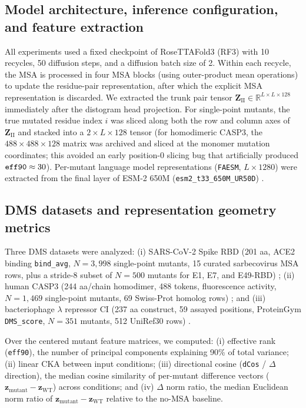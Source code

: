 \documentclass[10pt,a4paper]{article}
\begin{document}
\subsection{Model architecture, inference configuration, and feature extraction}
All experiments used a fixed checkpoint of RoseTTAFold3 (RF3) \citep{corley2025atomworks} with 10 recycles, 50 diffusion steps, and a diffusion batch size of 2. Within each recycle, the MSA is processed in four MSA blocks (using outer-product mean operations) to update the residue-pair representation, after which the explicit MSA representation is discarded. We extracted the trunk pair tensor $\mathbf{Z}_{\mathrm{II}} \in \mathbb{R}^{L \times L \times 128}$ immediately after the distogram head projection. For single-point mutants, the true mutated residue index $i$ was sliced along both the row and column axes of $\mathbf{Z}_{\mathrm{II}}$ and stacked into a $2 \times L \times 128$ tensor (for homodimeric CASP3, the $488 \times 488 \times 128$ matrix was archived and sliced at the monomer mutation coordinates; this avoided an early position-0 slicing bug that artificially produced $\text{\texttt{eff90}} \approx 30$). Per-mutant language model representations (\texttt{FAESM}, $L \times 1280$) were extracted from the final layer of ESM-2 650M (\texttt{esm2\_t33\_650M\_UR50D}) \citep{lin2023evolutionary}.

\subsection{DMS datasets and representation geometry metrics}
Three DMS datasets were analyzed: (i) SARS-CoV-2 Spike RBD (201 aa, ACE2 binding \texttt{bind\_avg}, $N=3,998$ single-point mutants, 15 curated sarbecovirus MSA rows, plus a stride-8 subset of $N=500$ mutants for E1, E7, and E49-RBD) \citep{starr2020deep}; (ii) human CASP3 (244 aa/chain homodimer, 488 tokens, fluorescence activity, $N=1,469$ single-point mutants, 69 Swiss-Prot homolog rows) \citep{roychowdhury2022microfluidic}; and (iii) bacteriophage $\lambda$ repressor CI (237 aa construct, 59 assayed positions, ProteinGym \texttt{DMS\_score}, $N=351$ mutants, 512 UniRef30 rows) \citep{notin2023proteingym}.

Over the centered mutant feature matrices, we computed: (i) effective rank (\texttt{eff90}), the number of principal components explaining 90\% of total variance; (ii) linear CKA \citep{kornblith2019similarity} between input conditions; (iii) directional cosine (\texttt{dCos} / $\Delta$ direction), the median cosine similarity of per-mutant difference vectors ($\mathbf{z}_{\mathrm{mutant}} - \mathbf{z}_{\mathrm{WT}}$) across conditions; and (iv) $\Delta$ norm ratio, the median Euclidean norm ratio of $\mathbf{z}_{\mathrm{mutant}} - \mathbf{z}_{\mathrm{WT}}$ relative to the no-MSA baseline.
\end{document}
